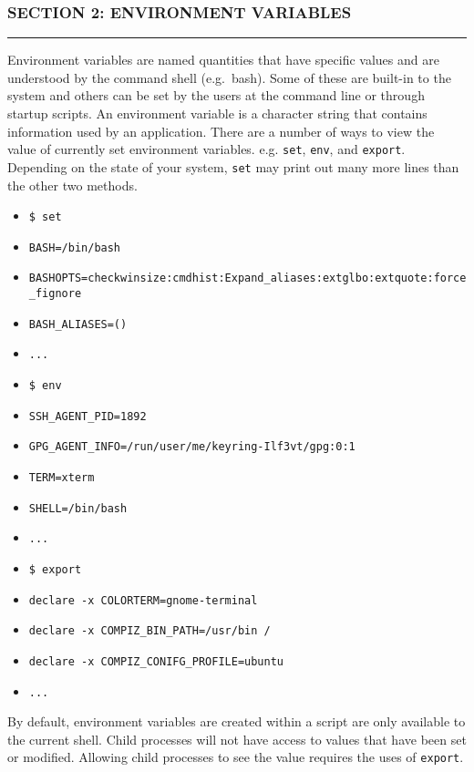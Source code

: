 \subsubsection{SECTION 2: ENVIRONMENT
VARIABLES}\label{section-2-environment-variables}

\begin{center}\rule{3in}{0.4pt}\end{center}

Environment variables are named quantities that have specific values and
are understood by the command shell (e.g.~bash). Some of these are
built-in to the system and others can be set by the users at the command
line or through startup scripts. An environment variable is a character
string that contains information used by an application. There are a
number of ways to view the value of currently set environment variables.
e.g. \texttt{set}, \texttt{env}, and \texttt{export}. Depending on the
state of your system, \texttt{set} may print out many more lines than
the other two methods.

\begin{itemize}
\item
  \texttt{\$ set}
\item
  \texttt{BASH=/bin/bash}
\item
  \texttt{BASHOPTS=checkwinsize:cmdhist:Expand\_aliases:extglbo:extquote:force\_fignore}
\item
  \texttt{BASH\_ALIASES=()}
\item
  \texttt{...}
\item
  \texttt{\$ env}
\item
  \texttt{SSH\_AGENT\_PID=1892}
\item
  \texttt{GPG\_AGENT\_INFO=/run/user/me/keyring-Ilf3vt/gpg:0:1}
\item
  \texttt{TERM=xterm}
\item
  \texttt{SHELL=/bin/bash}
\item
  \texttt{...}
\item
  \texttt{\$ export}
\item
  \texttt{declare -x COLORTERM=gnome-terminal}
\item
  \texttt{declare -x COMPIZ\_BIN\_PATH=/usr/bin /}
\item
  \texttt{declare -x COMPIZ\_CONIFG\_PROFILE=ubuntu}
\item
  \texttt{...}
\end{itemize}

By default, environment variables are created within a script are only
available to the current shell. Child processes will not have access to
values that have been set or modified. Allowing child processes to see
the value requires the uses of \texttt{export}.


